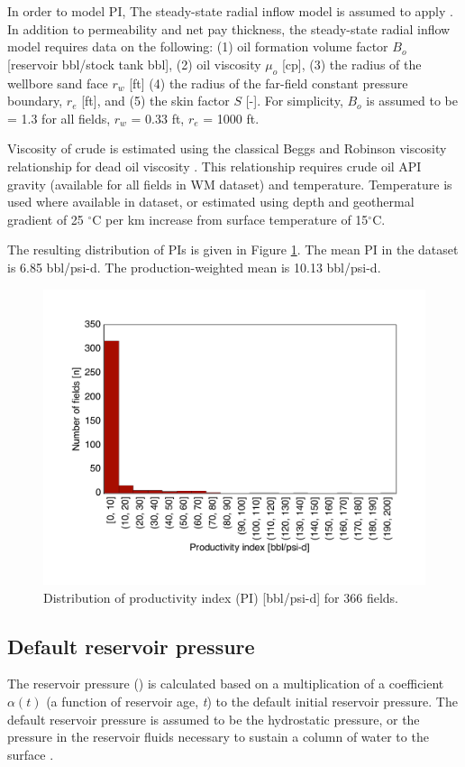 \documentclass[11pt]{report}
\newcommand{\xlname}[1]{\raisebox{1pt}{\fcolorbox{light-gray}{light-gray}{\texttt{\textcolor{stanford}{\scriptsize{#1}}}}}}
\begin{document}
In order to model PI, The steady-state radial inflow model is assumed to apply \cite[Ch. 3]{Guo2019}. In addition to permeability and net pay thickness, the steady-state radial inflow model requires data on the following: (1) oil formation volume factor $B_o$ [reservoir bbl/stock tank bbl], (2) oil viscosity $\mu_o$ [cp], (3) the radius of the wellbore sand face  $r_w$ [ft] (4) the radius of the far-field constant pressure boundary, $r_e$ [ft], and (5) the skin factor $S$ [-]. For simplicity, $B_o$ is assumed to be = 1.3 for all fields, $r_w$ = 0.33 ft, $r_e$ = 1000 ft. 

Viscosity of crude is estimated using the classical Beggs and Robinson viscosity relationship for dead oil viscosity \cite{PengTools2021}. This relationship requires crude oil API gravity (available for all fields in WM dataset) and temperature. Temperature is used where available in dataset, or estimated using depth and geothermal gradient of 25 $^\circ$C per km increase from surface temperature of 15$^\circ$C.

The resulting distribution of PIs is given in Figure \ref{fig:PIdist}. The mean PI in the dataset is 6.85 bbl/psi-d. The production-weighted mean is 10.13 bbl/psi-d.


\begin{figure}
\includegraphics[width=0.8\columnwidth]{images/ProdIndexDist.pdf}
\caption{Distribution of productivity index (PI) [bbl/psi-d] for 366 fields.}
\label{fig:PIdist}
\end{figure}



\subsection{Default reservoir pressure}
The reservoir pressure (\xlname{Res\_press}) is calculated based on a multiplication of a coefficient $\alpha (t)$ (a function of reservoir age, \emph{t}) to the default initial reservoir pressure. The default reservoir pressure is assumed to be the hydrostatic pressure, or the pressure in the reservoir fluids necessary to sustain a column of water to the surface \cite{fertl1981abnormal}. 
\end{document}

